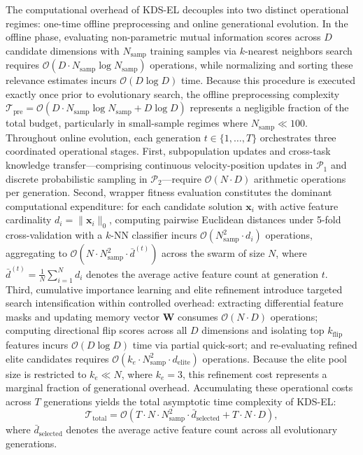The computational overhead of KDS-EL decouples into two distinct operational regimes: one-time offline preprocessing and online generational evolution. In the offline phase, evaluating non-parametric mutual information scores across $D$ candidate dimensions with $N_{\mathrm{samp}}$ training samples via $k$-nearest neighbors search requires $\mathcal{O}(D \cdot N_{\mathrm{samp}} \log N_{\mathrm{samp}})$ operations, while normalizing and sorting these relevance estimates incurs $\mathcal{O}(D \log D)$ time. Because this procedure is executed exactly once prior to evolutionary search, the offline preprocessing complexity $\mathcal{T}_{\mathrm{pre}} = \mathcal{O}(D \cdot N_{\mathrm{samp}} \log N_{\mathrm{samp}} + D \log D)$ represents a negligible fraction of the total budget, particularly in small-sample regimes where $N_{\mathrm{samp}} \ll 100$. Throughout online evolution, each generation $t \in \{1, \dots, T\}$ orchestrates three coordinated operational stages. First, subpopulation updates and cross-task knowledge transfer---comprising continuous velocity-position updates in $\mathcal{P}_1$ and discrete probabilistic sampling in $\mathcal{P}_2$---require $\mathcal{O}(N \cdot D)$ arithmetic operations per generation. Second, wrapper fitness evaluation constitutes the dominant computational expenditure: for each candidate solution $\mathbf{x}_i$ with active feature cardinality $d_i = \|\mathbf{x}_i\|_0$, computing pairwise Euclidean distances under 5-fold cross-validation with a $k$-NN classifier incurs $\mathcal{O}(N_{\mathrm{samp}}^2 \cdot d_i)$ operations, aggregating to $\mathcal{O}(N \cdot N_{\mathrm{samp}}^2 \cdot \bar{d}^{(t)})$ across the swarm of size $N$, where $\bar{d}^{(t)} = \frac{1}{N} \sum_{i=1}^N d_i$ denotes the average active feature count at generation $t$. Third, cumulative importance learning and elite refinement introduce targeted search intensification within controlled overhead: extracting differential feature masks and updating memory vector $\mathbf{W}$ consumes $\mathcal{O}(N \cdot D)$ operations; computing directional flip scores across all $D$ dimensions and isolating top $k_{\mathrm{flip}}$ features incurs $\mathcal{O}(D \log D)$ time via partial quick-sort; and re-evaluating refined elite candidates requires $\mathcal{O}(k_e \cdot N_{\mathrm{samp}}^2 \cdot d_{\mathrm{elite}})$ operations. Because the elite pool size is restricted to $k_e \ll N$, where $k_e = 3$, this refinement cost represents a marginal fraction of generational overhead. Accumulating these operational costs across $T$ generations yields the total asymptotic time complexity of KDS-EL:
\begin{equation}
\mathcal{T}_{\mathrm{total}} = \mathcal{O}\left(T \cdot N \cdot N_{\mathrm{samp}}^2 \cdot \bar{d}_{\mathrm{selected}} + T \cdot N \cdot D\right),
\label{eq:complexity}
\end{equation}
where $\bar{d}_{\mathrm{selected}}$ denotes the average active feature count across all evolutionary generations.


